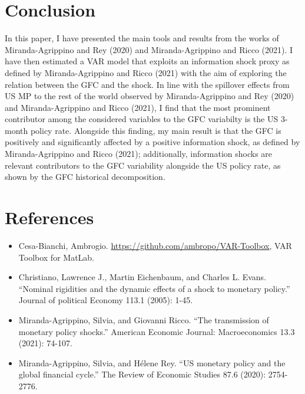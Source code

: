 \documentclass[11pt,a4paper]{article}
\begin{document}
\section{Conclusion}
In this paper, I have presented the main tools and results from the works of Miranda-Agrippino and Rey (2020) and Miranda-Agrippino and Ricco (2021). I have then estimated a VAR model that exploits an information shock proxy as defined by Miranda-Agrippino and Ricco (2021) with the aim of exploring the relation between the GFC and the shock.
In line with the spillover effects from US MP to the rest of the world observed by Miranda-Agrippino and Rey (2020) and Miranda-Agrippino and Ricco (2021), I find that the most prominent contributor among the considered variables to the GFC variabilty is the US 3-month policy rate. Alongside this finding, my main result is that the GFC is positively and significantly affected by a positive information shock, as defined by Miranda-Agrippino and Ricco (2021); additionally, information shocks are relevant contributors to the GFC variability alongside the US policy rate, as shown by the GFC historical decomposition. 




\section*{References}
\begin{itemize}
    \item Cesa-Bianchi, Ambrogio. \url{https://github.com/ambropo/VAR-Toolbox}, VAR Toolbox for MatLab.
    \item Christiano, Lawrence J., Martin Eichenbaum, and Charles L. Evans. \enquote{Nominal rigidities and the dynamic effects of a shock to monetary policy.} Journal of political Economy 113.1 (2005): 1-45.
    \item Miranda-Agrippino, Silvia, and Giovanni Ricco. \enquote{The transmission of monetary policy shocks.} American Economic Journal: Macroeconomics 13.3 (2021): 74-107.
    \item Miranda-Agrippino, Silvia, and Hélene Rey. \enquote{US monetary policy and the global financial cycle.} The Review of Economic Studies 87.6 (2020): 2754-2776.
    
\end{itemize}
\end{document}
